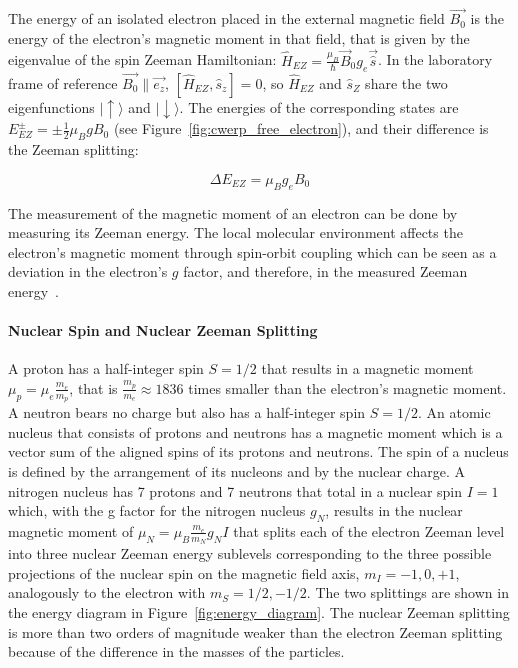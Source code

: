 \par

The energy of an isolated electron placed in the external magnetic field $\vec{B_0}$ is the energy of the electron's magnetic moment in that field, that is given by the eigenvalue of the spin Zeeman Hamiltonian: $\hat{H}_{EZ} = \frac{\mu_B}{\hbar} \vec{B}_0g_e\vec{\hat{s}}$. In the laboratory frame of reference $\vec{B_0}\parallel\vec{e_z}$, $\left[\hat{H}_{EZ},\hat{s}_z\right]=0$, so $\hat{H}_{EZ}$ and $\hat{s}_Z$ share the two eigenfunctions $\vert{\uparrow\rangle}$ and $\vert{\downarrow\rangle}$. The energies of the corresponding states are $E_{EZ}^{\pm} = \pm \frac{1}{2}\mu_B g B_0$ (see Figure~\ref{fig:cwerp_free_electron}), and their difference is the Zeeman splitting:

\begin{equation}
\label{eq:electron_zeeman}
\Delta E_{EZ} = \mu_B g_e B_0
\end{equation}

The measurement of the magnetic moment of an electron can be done by measuring its Zeeman energy. The local molecular environment affects the electron's magnetic moment through spin-orbit coupling which can be seen as a deviation in the electron's $g$ factor, and therefore, in the measured Zeeman energy~\cite{Carrington_g_factor}.



\paragraph*{Nuclear Spin and Nuclear Zeeman Splitting}
A proton has a half-integer spin $S=1/2$ that results in a magnetic moment $\mu_p = \mu_e\frac{m_e}{m_p}$, that is $\frac{m_p}{m_e}\approx1836$ times smaller than the electron's magnetic moment. A neutron bears no charge but also has a half-integer spin $S=1/2$. An atomic nucleus that consists of protons and neutrons has a magnetic moment which is a vector sum of the aligned spins of its protons and neutrons. The spin of a nucleus is defined by the arrangement of its nucleons and by the nuclear charge. A nitrogen nucleus has 7 protons and 7 neutrons that total in a nuclear spin $I=1$ which, with the g factor for the nitrogen nucleus $g_N$, results in the nuclear magnetic moment of $\mu_N=\mu_B\frac{m_e}{m_N}g_NI$ that splits each of the electron Zeeman level into three nuclear Zeeman energy sublevels corresponding to the three possible projections of the nuclear spin on the magnetic field axis, $m_I=-1,0,+1$, analogously to the electron with $m_S=1/2,-1/2$. The two splittings are shown in the energy diagram in Figure~\ref{fig:energy_diagram}. The nuclear Zeeman splitting is more than two orders of magnitude weaker than the electron Zeeman splitting because of the difference in the masses of the particles.

